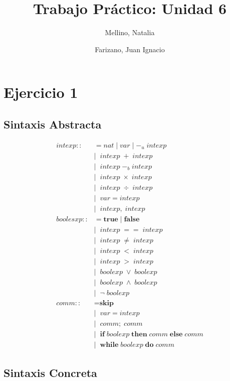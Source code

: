 \documentclass[11pt]{article}
\title{Trabajo Práctico: Unidad 6}
\author{Mellino, Natalia \and Farizano, Juan Ignacio}
\date{}
\begin{document}
\maketitle


\section{Ejercicio 1}
\subsection{Sintaxis Abstracta}

\begin{align*}
intexp ::&= nat \; | \; var \; | \; -_u \; intexp \\
         &| \;\; intexp \; +  \; intexp \\
         &| \;\; intexp \; -_b  \; intexp \\
         &| \;\; intexp \; \times  \; intexp \\
         &| \;\; intexp \; \div  \; intexp \\
         &| \;\; var = intexp \\
         &| \;\; intexp, \; intexp \\
boolesxp ::&= \textbf{true} \; | \; \textbf{false} \\
           &| \;\; intexp \; ==  \; intexp \\
           &| \;\; intexp \; \neq  \; intexp \\
           &| \;\; intexp \; <  \; intexp \\
           &| \;\; intexp \; >  \; intexp \\
           &| \;\; boolexp \; \lor  \; boolexp \\
           &| \;\; boolexp \; \land  \; boolexp \\
           &| \;\; \neg \; boolexp \\
comm ::&= \textbf{skip} \\
       &| \;\; var = intexp \\
       &| \;\; comm; \; comm \\
       &| \;\; \textbf{if} \; boolexp \; \textbf{then} \; comm \; \textbf{else} \; comm \\
       &| \; \; \textbf{while} \; boolexp \; \textbf{do} \; comm
\end{align*}

\subsection{Sintaxis Concreta}
\end{document}

